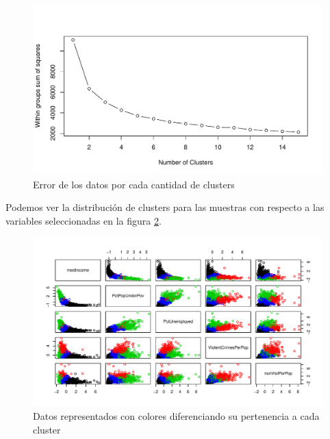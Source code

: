 \documentclass[a4paper,10pt,twocolumn]{article}
\begin{document}
	\begin{figure}[htb]
		\begin{center}
			\includegraphics[width=\columnwidth]{figures/cluster_n_2.pdf}
		\end{center}
		\caption{Error de los datos por cada cantidad de clusters \label{fig:cluster_n_2}}%
	\end{figure}

	Podemos ver la distribución de clusters para las muestras con respecto a las variables seleccionadas en la figura \ref{fig:plot_clusters}.

	\begin{figure}[htb]
		\begin{center}
			\includegraphics[width=\columnwidth]{figures/plot_clusters.pdf}
		\end{center}
		\caption{Datos representados con colores diferenciando su pertenencia a cada cluster \label{fig:plot_clusters}}%
	\end{figure}
	
\end{document}
